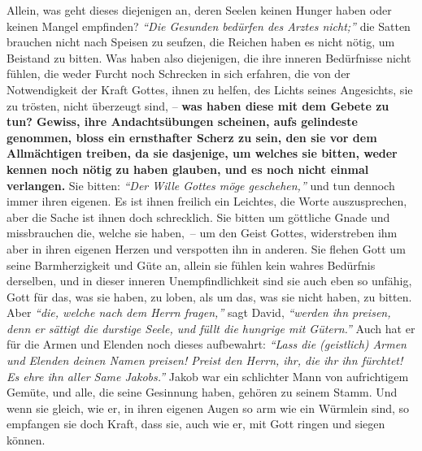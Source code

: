  Allein, was geht dieses
diejenigen an, deren Seelen keinen Hunger haben oder keinen Mangel empfinden?
\textit{"`Die Gesunden bedürfen des Arztes nicht;"'}
die Satten brauchen nicht nach Speisen zu
seufzen, die Reichen haben es nicht nötig, um Beistand zu bitten. Was haben also
diejenigen, die ihre inneren Bedürfnisse nicht
fühlen, die weder Furcht noch
Schrecken in sich erfahren, die von der Notwendigkeit der Kraft Gottes, ihnen
zu helfen, des Lichts seines Angesichts, sie zu trösten, nicht
überzeugt sind, \label{ref:06_07_sinnlose_gebete}
-- \textbf{was haben diese mit dem Gebete zu tun? Gewiss, ihre Andachtsübungen
scheinen, aufs gelindeste genommen, bloss ein ernsthafter Scherz zu sein, den
sie vor dem Allmächtigen treiben, da sie dasjenige, um welches sie bitten, weder
kennen noch nötig zu haben glauben, und es noch nicht einmal verlangen.} Sie
bitten:
\textit{"`Der Wille Gottes möge geschehen,"'}
und tun dennoch immer ihren
eigenen. Es ist ihnen freilich ein
Leichtes, die Worte auszusprechen, aber die
Sache ist ihnen doch schrecklich. Sie bitten um göttliche Gnade und
missbrauchen die, welche sie haben,~-- um den Geist Gottes, widerstreben ihm
aber in ihren eigenen Herzen und verspotten ihn in anderen.
Sie flehen Gott um
seine Barmherzigkeit und Güte an, allein sie fühlen kein wahres Bedürfnis
derselben, und in dieser inneren Unempfindlichkeit sind sie auch eben so
unfähig, Gott für das, was sie haben, zu loben, als um das, was sie nicht haben,
zu bitten. Aber \textit{"`die, welche nach dem Herrn fragen,"'} sagt David,
\textit{"`werden ihn preisen, denn er sättigt die durstige Seele, und füllt
die hungrige mit Gütern."'}
Auch hat er für die Armen und Elenden
noch dieses aufbewahrt:
\textit{"`Lass die (geistlich) Armen und Elenden deinen
Namen
preisen! Preist den Herrn, ihr, die ihr ihn fürchtet! Es ehre ihn aller Same
Jakobs."'}
Jakob war ein schlichter Mann von
aufrichtigem Gemüte, und alle, die seine Gesinnung haben, gehören zu seinem
Stamm. Und wenn sie gleich, wie er, in ihren eigenen Augen so arm wie ein
Würmlein sind, so empfangen sie doch Kraft, dass sie, auch wie er, mit Gott
ringen und siegen können.

